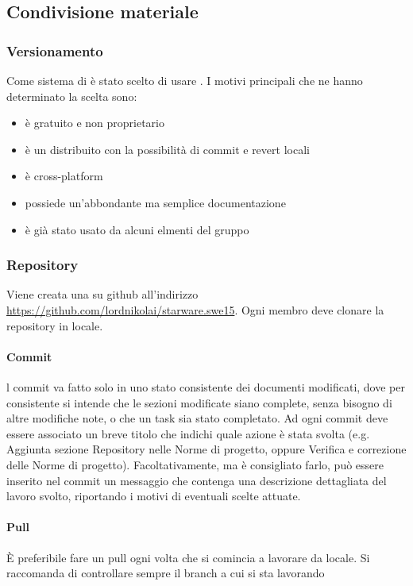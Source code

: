 \documentclass[12pt,a4paper]{article}
\begin{document}
\subsection{Condivisione materiale}

\subsubsection{Versionamento}\label{versionamento} %
Come sistema di  è stato scelto di usare . I motivi principali che ne hanno determinato la scelta sono:
\begin{itemize}
\item è gratuito e non proprietario
\item è un  distribuito con la possibilità di commit e revert locali
\item è cross-platform
\item possiede un'abbondante ma semplice documentazione
\item è già stato usato da alcuni elmenti del gruppo
\end{itemize}

\subsubsection{Repository} \label{sec:rep} %
Viene creata una  su github all'indirizzo \url{https://github.com/lordnikolai/starware.swe15}. Ogni membro deve clonare la repository in locale.

\paragraph{Commit}
l commit va fatto solo in uno stato consistente dei documenti modificati, dove per consistente si intende che le sezioni modificate siano complete, senza bisogno di altre modifiche note, o che un task sia stato completato. Ad ogni commit deve essere associato un breve titolo che indichi quale azione è stata svolta (e.g. Aggiunta sezione Repository nelle Norme di progetto, oppure Verifica e correzione delle Norme di progetto). Facoltativamente, ma è consigliato farlo, può essere inserito nel commit un messaggio che contenga una descrizione dettagliata del lavoro svolto, riportando i motivi di eventuali scelte attuate.
\paragraph{Pull}
È preferibile fare un pull ogni volta che si comincia a lavorare da locale. Si raccomanda di controllare sempre il branch a cui si sta lavorando
\end{document}
